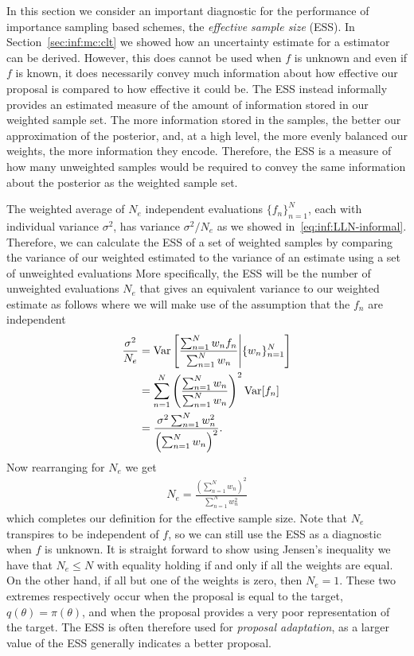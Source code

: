 In this section we consider an important diagnostic for the performance of importance
sampling based schemes, the \emph{effective sample size} (ESS).  In
Section~\ref{sec:inf:mc:clt} we showed how an uncertainty estimate for a \mc
estimator can be derived.  However, this does cannot be used when $f$ is unknown
and even if $f$ is known, it does necessarily convey much information about how effective
our proposal is compared to how effective it could be.  The ESS instead informally provides an
estimated measure of the amount of information stored in our weighted sample set.
The more information stored in the samples, the better our approximation of the posterior, and,
at a high level, the more evenly balanced our weights, the more information they encode.
Therefore, the ESS is a measure of how many unweighted samples would be required to
convey the same information about the posterior as the weighted sample set.

The weighted average of $N_e$ independent evaluations $\{f_n\}_{n=1}^N$, each 
with individual variance $\sigma^2$,
has variance $\sigma^2 / N_e$ as we showed in~\eqref{eq:inf:LLN-informal}.  Therefore,
we can calculate the ESS of a set of weighted samples by comparing the variance of our 
weighted estimated to the variance of an estimate using a
set of unweighted evaluations  More specifically, the ESS will be the number of unweighted evaluations
$N_e$ that gives an equivalent variance to our weighted estimate as follows where we
will make use of the assumption that the $f_n$ are independent
\begin{align}
\frac{\sigma^2}{N_e} &= \mathrm{Var} \left[\frac{\sum_{n=1}^{N} w_n f_n}{\sum_{n=1}^{N} w_n} \middle| 
														\{w_n\}_{n=1}^N\right] \nonumber \\
&= \sum_{n=1}^{N} \left(\frac{\sum_{n=1}^{N} w_n}{\sum_{n=1}^{N} w_n} \right)^2 \mathrm{Var} [f_n] \nonumber \\
&= \frac{\sigma^2\sum_{n=1}^{N} w_n^2}{\left(\sum_{n=1}^{N} w_n\right)^2}.
\end{align}
Now rearranging for $N_e$ we get
\begin{align}
\label{eq:inf:ess}
N_e = \frac{\left(\sum_{n=1}^{N} w_n\right)^2}{\sum_{n=1}^{N} w_n^2}
\end{align}
which completes our definition for the effective sample size.  Note that $N_e$ transpires
to be independent of $f$, so we can still use the ESS as a diagnostic when $f$ is unknown.
It is straight forward to show using Jensen's inequality we have that $N_e\le N$ with equality
holding if and only if all the weights are equal.  On the other hand, if all but one of the weights
is zero, then $N_e=1$.  These two extremes respectively occur when the proposal
is equal to the target, $q(\theta)=\pi(\theta)$, and when the proposal provides a very poor
representation of the target.  The ESS is often therefore used for \emph{proposal adaptation},
as a larger value of the ESS generally indicates a better proposal.

